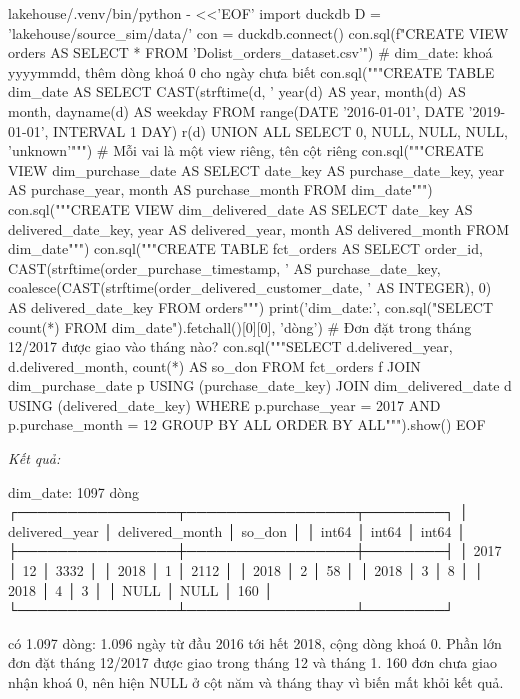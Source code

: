 \begin{codeblock}
lakehouse/.venv/bin/python - <<'EOF'
import duckdb
D = 'lakehouse/source_sim/data/'
con = duckdb.connect()
con.sql(f"CREATE VIEW orders AS SELECT * FROM '{D}olist_orders_dataset.csv'")
# dim_date: khoá yyyymmdd, thêm dòng khoá 0 cho ngày chưa biết
con.sql("""CREATE TABLE dim_date AS
  SELECT CAST(strftime(d, '%
         year(d) AS year, month(d) AS month, dayname(d) AS weekday
  FROM range(DATE '2016-01-01', DATE '2019-01-01', INTERVAL 1 DAY) r(d)
  UNION ALL SELECT 0, NULL, NULL, NULL, 'unknown'""")
# Mỗi vai là một view riêng, tên cột riêng
con.sql("""CREATE VIEW dim_purchase_date AS SELECT date_key AS purchase_date_key,
             year AS purchase_year, month AS purchase_month FROM dim_date""")
con.sql("""CREATE VIEW dim_delivered_date AS SELECT date_key AS delivered_date_key,
             year AS delivered_year, month AS delivered_month FROM dim_date""")
con.sql("""CREATE TABLE fct_orders AS
  SELECT order_id,
         CAST(strftime(order_purchase_timestamp, '%
           AS purchase_date_key,
         coalesce(CAST(strftime(order_delivered_customer_date, '%
                       AS INTEGER), 0) AS delivered_date_key
  FROM orders""")
print('dim_date:', con.sql("SELECT count(*) FROM dim_date").fetchall()[0][0], 'dòng')
# Đơn đặt trong tháng 12/2017 được giao vào tháng nào?
con.sql("""SELECT d.delivered_year, d.delivered_month, count(*) AS so_don
           FROM fct_orders f
           JOIN dim_purchase_date p USING (purchase_date_key)
           JOIN dim_delivered_date d USING (delivered_date_key)
           WHERE p.purchase_year = 2017 AND p.purchase_month = 12
           GROUP BY ALL ORDER BY ALL""").show()
EOF
\end{codeblock}
\textit{Kết quả:}
\begin{codeblock}
dim_date: 1097 dòng
┌────────────────┬─────────────────┬────────┐
│ delivered_year │ delivered_month │ so_don │
│     int64      │      int64      │ int64  │
├────────────────┼─────────────────┼────────┤
│           2017 │              12 │   3332 │
│           2018 │               1 │   2112 │
│           2018 │               2 │     58 │
│           2018 │               3 │      8 │
│           2018 │               4 │      3 │
│           NULL │            NULL │    160 │
└────────────────┴─────────────────┴────────┘
\end{codeblock}

 có 1.097 dòng: 1.096 ngày từ đầu 2016 tới hết 2018, cộng dòng khoá 0. Phần lớn đơn đặt tháng 12/2017 được giao trong tháng 12 và tháng 1. 160 đơn chưa giao nhận khoá 0, nên hiện NULL ở cột năm và tháng thay vì biến mất khỏi kết quả.


